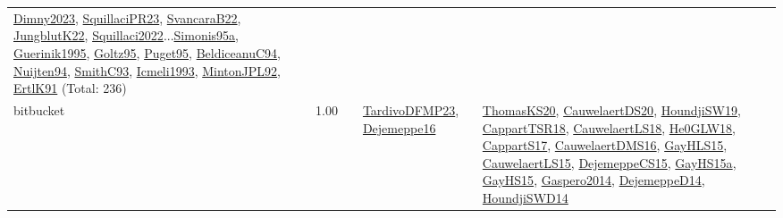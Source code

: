 {\begin{longtable}{p{3cm}r>{\raggedright\arraybackslash}p{6cm}>{\raggedright\arraybackslash}p{6cm}>{\raggedright\arraybackslash}p{8cm}}
\hyperref[detail:Dimny2023]{Dimny2023}, \hyperref[detail:SquillaciPR23]{SquillaciPR23}, \hyperref[detail:SvancaraB22]{SvancaraB22}, \hyperref[detail:JungblutK22]{JungblutK22}, \hyperref[detail:Squillaci2022]{Squillaci2022}...\hyperref[detail:Simonis95a]{Simonis95a}, \hyperref[detail:Guerinik1995]{Guerinik1995}, \hyperref[detail:Goltz95]{Goltz95}, \hyperref[detail:Puget95]{Puget95}, \hyperref[detail:BeldiceanuC94]{BeldiceanuC94}, \hyperref[detail:Nuijten94]{Nuijten94}, \hyperref[detail:SmithC93]{SmithC93}, \hyperref[detail:Icmeli1993]{Icmeli1993}, \hyperref[detail:MintonJPL92]{MintonJPL92}, \hyperref[detail:ErtlK91]{ErtlK91} (Total: 236)\\
\index{bitbucket}\index{Benchmarks!bitbucket}bitbucket &  1.00 &  & \hyperref[detail:TardivoDFMP23]{TardivoDFMP23}, \hyperref[detail:Dejemeppe16]{Dejemeppe16} & \hyperref[detail:ThomasKS20]{ThomasKS20}, \hyperref[detail:CauwelaertDS20]{CauwelaertDS20}, \hyperref[detail:HoundjiSW19]{HoundjiSW19}, \hyperref[detail:CappartTSR18]{CappartTSR18}, \hyperref[detail:CauwelaertLS18]{CauwelaertLS18}, \hyperref[detail:He0GLW18]{He0GLW18}, \hyperref[detail:CappartS17]{CappartS17}, \hyperref[detail:CauwelaertDMS16]{CauwelaertDMS16}, \hyperref[detail:GayHLS15]{GayHLS15}, \hyperref[detail:CauwelaertLS15]{CauwelaertLS15}, \hyperref[detail:DejemeppeCS15]{DejemeppeCS15}, \hyperref[detail:GayHS15a]{GayHS15a}, \hyperref[detail:GayHS15]{GayHS15}, \hyperref[detail:Gaspero2014]{Gaspero2014}, \hyperref[detail:DejemeppeD14]{DejemeppeD14}, \hyperref[detail:HoundjiSWD14]{HoundjiSWD14}\\

\end{longtable}}
